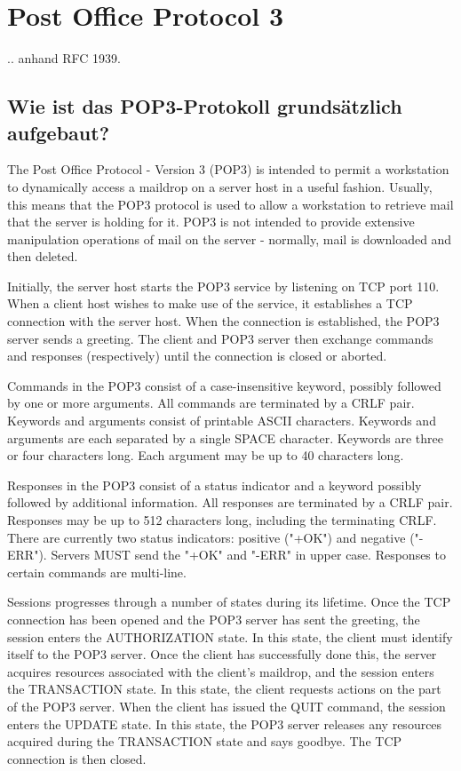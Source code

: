 \documentclass[11pt]{article}
\begin{document}
    \section{Post Office Protocol 3}
    .. anhand RFC 1939.
    \subsection{Wie ist das POP3-Protokoll grundsätzlich aufgebaut?}
    The Post Office Protocol - Version 3 (POP3) is intended to
    permit a workstation to dynamically access a maildrop on a server
    host in a useful fashion.  Usually, this means that the POP3 protocol
    is used to allow a workstation to retrieve mail that the server is
    holding for it. POP3 is not intended to provide extensive manipulation operations of
    mail on the server - normally, mail is downloaded and then deleted.

    Initially, the server host starts the POP3 service by listening on
    TCP port 110. When a client host wishes to make use of the service,
    it establishes a TCP connection with the server host.  When the
    connection is established, the POP3 server sends a greeting.  The
    client and POP3 server then exchange commands and responses
    (respectively) until the connection is closed or aborted.

    Commands in the POP3 consist of a case-insensitive keyword, possibly
    followed by one or more arguments.  All commands are terminated by a
    CRLF pair.  Keywords and arguments consist of printable ASCII
    characters.  Keywords and arguments are each separated by a single
    SPACE character.  Keywords are three or four characters long. Each
    argument may be up to 40 characters long.

    Responses in the POP3 consist of a status indicator and a keyword
    possibly followed by additional information.  All responses are
    terminated by a CRLF pair.  Responses may be up to 512 characters
    long, including the terminating CRLF.  There are currently two status
    indicators: positive ("+OK") and negative ("-ERR").  Servers MUST
    send the "+OK" and "-ERR" in upper case. Responses to certain commands are multi-line.

    Sessions progresses through a number of states during its
    lifetime.  Once the TCP connection has been opened and the POP3
    server has sent the greeting, the session enters the AUTHORIZATION
    state.  In this state, the client must identify itself to the POP3
    server.  Once the client has successfully done this, the server
    acquires resources associated with the client's maildrop, and the
    session enters the TRANSACTION state.  In this state, the client
    requests actions on the part of the POP3 server.  When the client has
    issued the QUIT command, the session enters the UPDATE state.  In
    this state, the POP3 server releases any resources acquired during
    the TRANSACTION state and says goodbye.  The TCP connection is then
    closed.
\end{document}
